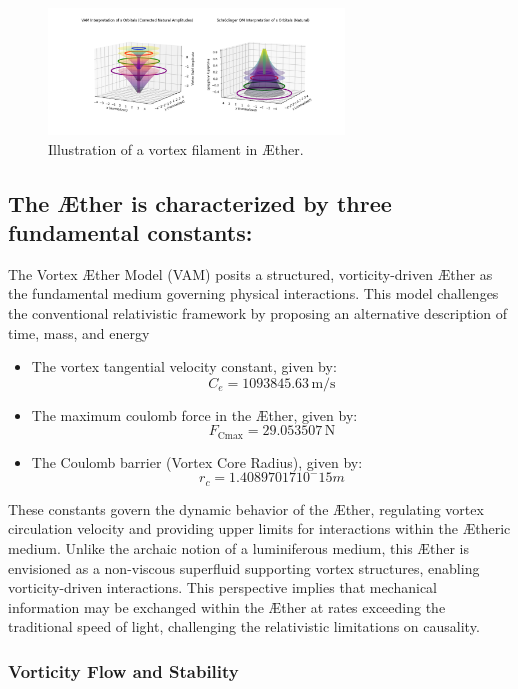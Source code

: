 \begin{figure}[h]
    \centering
    \includegraphics[width=0.7\textwidth]{vortex_diagram}
    \caption{Illustration of a vortex filament in \AE ther.}
    \label{fig:vortex}
\end{figure}

\subsection{The \AE ther is characterized by three fundamental constants:}\label{subsec:the-ae-ther-is-characterized-by-three-fundamental-constants:}

The Vortex \AE ther Model (VAM) posits a structured, vorticity-driven \AE ther as the fundamental medium governing physical interactions.
This model challenges the conventional relativistic framework by proposing an alternative description of time, mass, and energy



\begin{itemize}
    \item The vortex tangential velocity constant, given by: \[C_e = 1093845.63 \, \mathrm{m/s}\]
    \item The maximum coulomb force in the \AE ther, given by:\[F_{\text{Cmax}} = 29.053507 \, \mathrm{N}\]
    \item The Coulomb barrier (Vortex Core Radius), given by: \[r_c = 1.40897017 10^-15 m\]
\end{itemize}

These constants govern the dynamic behavior of the \AE ther, regulating vortex circulation velocity and providing upper limits for interactions within the \AE theric medium.
Unlike the archaic notion of a luminiferous medium, this \AE ther is envisioned as a non-viscous superfluid supporting vortex structures, enabling vorticity-driven interactions.
This perspective implies that mechanical information may be exchanged within the \AE ther at rates exceeding the traditional speed of light, challenging the relativistic limitations on causality.


\subsubsection*{Vorticity Flow and Stability}

